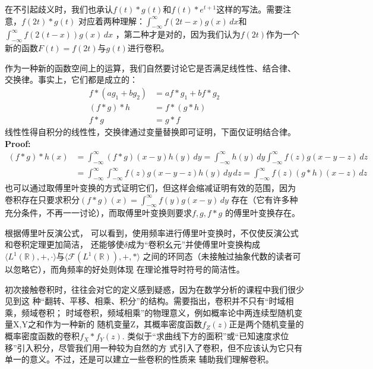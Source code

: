 \documentclass{ctexbook}
\begin{document}
在不引起歧义时，我们也承认$f(t)*g(t)$和$f(t)*e^{t+1}$这样的写法。需要注意，$f(2t)*g(t)$
对应着两种理解：$\int_{-\infty}^{\infty}f(2t-x)g(x)\,dx$和$\int_{-\infty}^{\infty}f(2(t-x))g(x)\,dx$
，第二种才是对的，因为我们认为$f(2t)$作为一个新的函数$F(t)=f(2t)$与$g(t)$进行卷积。

作为一种新的函数空间上的运算，我们自然要讨论它是否满足线性性、结合律、
交换律。事实上，它们都是成立的：
\begin{align}
    f*(ag_1+bg_2) & =af*g_1+bf*g_2 \\
    (f*g)*h       & =f*(g*h)       \\
    f*g           & =g*f
\end{align}
线性性得自积分的线性性，交换律通过变量替换即可证明，下面仅证明结合律。\\
\textbf{Proof:}
\begin{align*}
    (f*g)*h(x) & =\int_{-\infty}^{\infty}(f*g)(x-y)h(y)\,dy=\int_{-\infty}^{\infty}h(y)\,dy\int_{-\infty}^{\infty}f(z)g(x-y-z)\,dz \\
               & =\int_{-\infty}^{\infty}\int_{-\infty}^{\infty}f(z)g(x-y-z)h(y)\,dy\,dz=\int_{-\infty}^{\infty}f(z)(g*h)(x-z)\,dz
\end{align*}
也可以通过取傅里叶变换的方式证明它们，但这样会缩减证明有效的范围，因为
卷积存在只要求积分$(f*g)(x)=\int_{-\infty}^{\infty}f(y)g(x-y)\,dy$
存在（它有许多种充分条件，不再一一讨论），而取傅里叶变换则要求$f,g,f*g$
的傅里叶变换存在。

根据傅里叶反演公式，
可以看到，使用频率进行傅里叶变换时，不仅使反演公式和卷积定理更加简洁，
还能够使$\delta$成为“卷积幺元”并使傅里叶变换构成
$\langle L^1(\mathbb{R}),+,\cdot\rangle$与$\langle \mathcal{F} (L^1(\mathbb{R})),+,*\rangle$
之间的环同态（未接触过抽象代数的读者可以忽略它），而角频率的好处则体现
在理论推导时符号的简洁性。

初次接触卷积时，往往会对它的定义感到疑惑，因为在数学分析的课程中我们很少见到这
种“翻转、平移、相乘、积分”的结构。需要指出，卷积并不只有“时域相乘，频域卷积；
时域卷积，频域相乘”的物理意义，例如概率论中两连续型随机变量X,Y之和作为一种新的
随机变量Z，其概率密度函数$f_Z(z)$正是两个随机变量的概率密度函数的卷积$f_X*f_Y(z)$.
类似于“求曲线下方的面积”或“已知速度求位移”引入积分，尽管我们用一种较为自然的方
式引入了卷积，但不应该认为它只有单一的意义。不过，还是可以建立一些卷积的性质来
辅助我们理解卷积。
\end{document}
